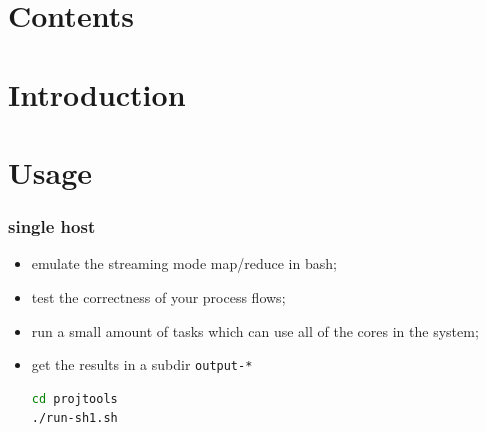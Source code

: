 \documentclass{beamer}
\title{\sc{\doctitle}}
\author{\docauthor}
\date{Nov 25, 2015}
\theoremstyle{definition}
\theoremstyle{remark}
\begin{document}
\frame{\titlepage}
\section*{Contents}%
\frame{\tableofcontents}



\section{Introduction}





\section{Usage}

\begin{frame}[fragile]
  \frametitle<presentation>{single host}

    \begin{itemize}
      \item emulate the streaming mode map/reduce in bash;
      \item test the correctness of your process flows;
      \item run a small amount of tasks which can use all of the cores in the system;

      \item get the results in a subdir \texttt{output-*}
\begin{lstlisting}[language=bash]
cd projtools
./run-sh1.sh
\end{lstlisting}
    \end{itemize}

\end{frame}
\end{document}
